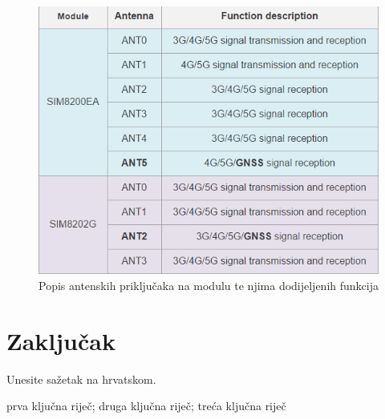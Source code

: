 \documentclass[zavrsnirad]{fer}
\begin{document}
\begin{figure}[htb]
  \centering
  \includegraphics[width=0.8\linewidth]{Figures/SIM8262E-M2_5G_HAT07.png} 
  \caption{Popis antenskih priključaka na modulu te njima dodijeljenih funkcija \cite{WaveshareModule}}
  \label{slk:sim8200eamodul}
\end{figure}

\chapter{Zaključak}
\label{pog:zakljucak}

\blindtext








\begin{sazetak}
  Unesite sažetak na hrvatskom.

  \blindtext
\end{sazetak}

\begin{kljucnerijeci}
  prva ključna riječ; druga ključna riječ; treća ključna riječ
\end{kljucnerijeci}
\end{document}
